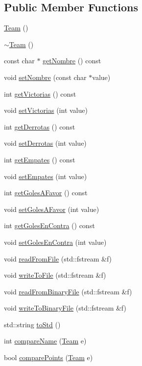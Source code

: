 \subsection*{Public Member Functions}
\begin{DoxyCompactItemize}
\item 
\hyperlink{class_team_aada295895b747960576b69d8c87a54ba}{Team} ()
\item 
\hyperlink{class_team_ab4218fddd612d52bab47bec4feeb49de}{$\sim$\+Team} ()
\item 
const char $\ast$ \hyperlink{class_team_acd3112602057d3c2df5dc97b7edf23db}{get\+Nombre} () const 
\item 
void \hyperlink{class_team_a4e2bdf61ee9103b54c01bf65a3300bed}{set\+Nombre} (const char $\ast$value)
\item 
int \hyperlink{class_team_a850c83b0e189300223e30e7f2a60f2b2}{get\+Victorias} () const 
\item 
void \hyperlink{class_team_a43b0095989199cafdbdb1cf87a2eba2f}{set\+Victorias} (int value)
\item 
int \hyperlink{class_team_ab312101d725492afb23e59bfaf7385ae}{get\+Derrotas} () const 
\item 
void \hyperlink{class_team_a0e8272a4c5127fcd4be5444dd22cda9f}{set\+Derrotas} (int value)
\item 
int \hyperlink{class_team_a4ce48abf872a9edc65e8739696ff0172}{get\+Empates} () const 
\item 
void \hyperlink{class_team_a9dfa2c82540d9321e6cafb6acded557f}{set\+Empates} (int value)
\item 
int \hyperlink{class_team_af2cb553ca5d7cff6c99150227aa05ff3}{get\+Goles\+A\+Favor} () const 
\item 
void \hyperlink{class_team_af21b432f707a656148c6626f105a93cc}{set\+Goles\+A\+Favor} (int value)
\item 
int \hyperlink{class_team_a078b78acbd9f55b9693489856a2846fe}{get\+Goles\+En\+Contra} () const 
\item 
void \hyperlink{class_team_a68c254ae21bea1353f5398b9858e7ff6}{set\+Goles\+En\+Contra} (int value)
\item 
void \hyperlink{class_team_a6a01d394b9a3b4bfa70c5f3e97b87838}{read\+From\+File} (std\+::fstream \&f)
\item 
void \hyperlink{class_team_ab4c45dc605b73e2e45b99c58b2057a78}{write\+To\+File} (std\+::fstream \&f)
\item 
void \hyperlink{class_team_a08fa8e9c4ba4913520597ae57998910f}{read\+From\+Binary\+File} (std\+::fstream \&f)
\item 
void \hyperlink{class_team_a62b8bf4f0af5579461d0667ed5dfda4f}{write\+To\+Binary\+File} (std\+::fstream \&f)
\item 
std\+::string \hyperlink{class_team_a1030dce9ad53dc47351a3fa44980b77b}{to\+Std} ()
\item 
int \hyperlink{class_team_a7df766985a420a79a13767265d0ced85}{compare\+Name} (\hyperlink{class_team}{Team} e)
\item 
bool \hyperlink{class_team_aefc53486468ddf341ad1d2ad3e0578d4}{compare\+Points} (\hyperlink{class_team}{Team} e)
\end{DoxyCompactItemize}
